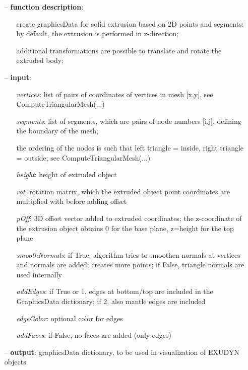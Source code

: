 \begin{itemize}[leftmargin=1.4cm]
\begin{itemize}[leftmargin=1.4cm]
\begin{itemize}[leftmargin=1.4cm]
\begin{itemize}[leftmargin=0.5cm]
\begin{itemize}[leftmargin=1.4cm]
\begin{itemize}[leftmargin=1.4cm]
\begin{itemize}[leftmargin=0.5cm]
\begin{itemize}[leftmargin=1.4cm]
\begin{itemize}[leftmargin=0.5cm]
\begin{itemize}[leftmargin=0.7cm]
\item[--]
{\bf function description}: \vspace{-6pt}
\begin{itemize}[leftmargin=1.2cm]
\setlength{\itemindent}{-0.7cm}
\item[]create graphicsData for solid extrusion based on 2D points and segments; by default, the extrusion is performed in z-direction;
\item[]additional transformations are possible to translate and rotate the extruded body;
\end{itemize}
\item[--]
{\bf input}: \vspace{-6pt}
\begin{itemize}[leftmargin=1.2cm]
\setlength{\itemindent}{-0.7cm}
\item[]{\it vertices}: list of pairs of coordinates of vertices in mesh [x,y], see ComputeTriangularMesh(...)
\item[]{\it segments}: list of segments, which are pairs of node numbers [i,j], defining the boundary of the mesh;
\item[]the ordering of the nodes is such that left triangle = inside, right triangle = outside; see ComputeTriangularMesh(...)
\item[]{\it height}:   height of extruded object
\item[]{\it rot}:      rotation matrix, which the extruded object point coordinates are multiplied with before adding offset
\item[]{\it pOff}:     3D offset vector added to extruded coordinates; the z-coordinate of the extrusion object obtains 0 for the base plane, z=height for the top plane
\item[]{\it smoothNormals}: if True, algorithm tries to smoothen normals at vertices and normals are added; creates more points; if False, triangle normals are used internally
\item[]{\it addEdges}: if True or 1, edges at bottom/top are included in the GraphicsData dictionary; if 2, also mantle edges are included
\item[]{\it edgeColor}: optional color for edges
\item[]{\it addFaces}: if False, no faces are added (only edges)
\end{itemize}
\item[--]
{\bf output}: graphicsData dictionary, to be used in visualization of EXUDYN objects

\end{itemize}
\end{itemize}
\end{itemize}
\end{itemize}
\end{itemize}
\end{itemize}
\end{itemize}
\end{itemize}
\end{itemize}
\end{itemize}
